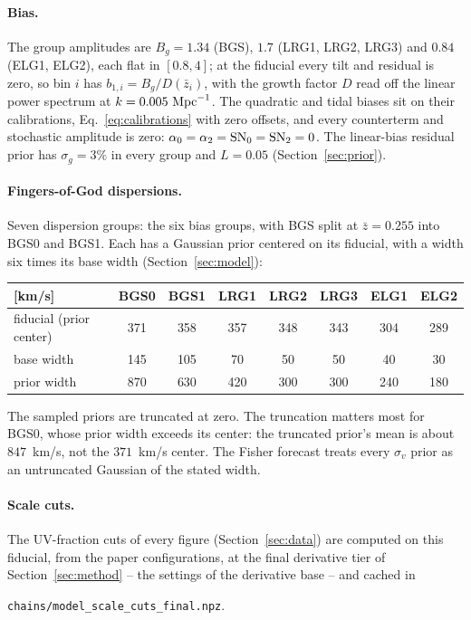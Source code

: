 \documentclass[11pt]{article}
\newcommand{\SNz}{{\rm SN}_0}
\newcommand{\SNt}{{\rm SN}_2}
\newcommand{\sigG}{3\%}
\newcommand{\Lcorr}{0.05}
\newcommand{\SigVfactor}{six}
\newcommand{\BGSzeroMean}{847}
\begin{document}
\paragraph{Bias.}
The group amplitudes are $B_g = 1.34$ (BGS), $1.7$ (LRG1, LRG2, LRG3)
and $0.84$ (ELG1, ELG2), each flat in $[0.8, 4]$; at the fiducial every
tilt and residual is zero, so bin $i$ has
$b_{1,i} = B_g/D(\bar{z}_i)$, with the growth factor $D$ read off the
linear power spectrum at $k = 0.005~{\rm Mpc}^{-1}$.  The quadratic and
tidal biases sit on their calibrations, Eq.~\eqref{eq:calibrations}
with zero offsets, and every counterterm and stochastic amplitude is
zero: $\alpha_0 = \alpha_2 = \SNz = \SNt = 0$.  The linear-bias
residual prior has $\sigma_g = \sigG$ in every group and $L = \Lcorr$
(Section~\ref{sec:prior}).

\paragraph{Fingers-of-God dispersions.}
Seven dispersion groups: the six bias groups, with BGS split at
$\bar{z} = 0.255$ into BGS0 and BGS1.  Each has a Gaussian prior
centered on its fiducial, with a width \SigVfactor{} times its base
width (Section~\ref{sec:model}):

\begin{center}
  \begin{tabular}{lccccccc}
    \toprule
    {[km/s]} & BGS0 & BGS1 & LRG1 & LRG2 & LRG3 & ELG1 & ELG2 \\
    \midrule
    fiducial (prior center) & 371 & 358 & 357 & 348 & 343 & 304 & 289 \\
    base width & 145 & 105 & 70 & 50 & 50 & 40 & 30 \\
    prior width & 870 & 630 & 420 & 300 & 300 & 240 & 180 \\
    \bottomrule
  \end{tabular}
\end{center}

The sampled priors are truncated at zero.  The truncation matters most
for BGS0, whose prior width exceeds its center: the truncated prior's
mean is about $\BGSzeroMean$~km/s, not the $371$~km/s center.  The
Fisher forecast treats every $\sigma_v$ prior as an untruncated
Gaussian of the stated width.

\paragraph{Scale cuts.}
The UV-fraction cuts of every figure (Section~\ref{sec:data}) are
computed on this fiducial, from the paper configurations, at the
final derivative tier of Section~\ref{sec:method} -- the settings of
the derivative base -- and cached in
\begin{center}
  \texttt{chains/model\_scale\_cuts\_final.npz}.
\end{center}
\end{document}
